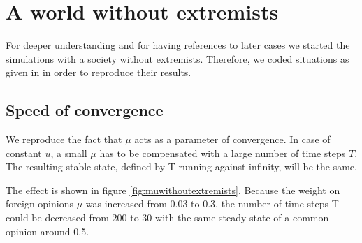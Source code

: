 \documentclass[11pt]{article}
\begin{document}
\section{A world without extremists}
For deeper understanding and for having references to later cases we started the simulations with a society without extremists. Therefore, we coded situations as given in \cite{Minor} in order to reproduce their results.

\subsection{Speed of convergence}
We reproduce the fact that $\mu$ acts as a parameter of convergence. In case of constant $u$, a small $\mu$ has to be compensated with a large number of time steps $T$. The resulting stable state, defined by T running against infinity, will be the same.

The effect is shown in figure \ref{fig:muwithoutextremists}. Because the weight on foreign opinions $\mu$ was increased from 0.03 to 0.3, the number of time steps T could be decreased from 200 to 30 with the same steady state of a common opinion around 0.5.
\end{document}

